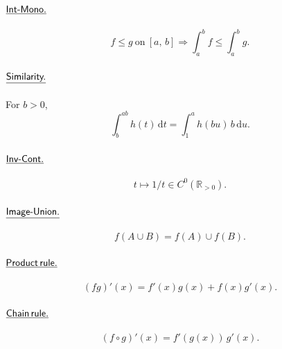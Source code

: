 \documentclass[11pt,reqno]{amsart}
\providecommand{\R}{\mathbb{R}}
\newcommand{\comma}{,\,\allowbreak}
\theoremstyle{redplain}
\begin{document}
\paragraph{$\textsf{\underline{Int-Mono.}}$}\text{\ }
\begin{equation}\label{eq:int-mono}
f\le g\ \text{on}\ [a\comma b]\Rightarrow\int_a^b f\le\int_a^b g.
\end{equation}

\paragraph{$\textsf{\underline{Similarity.}}$}\text{\ } For $b>0$\comma
\begin{equation}\label{eq:similarity}
\int_b^{ab} h(t)\,\mathrm{d}t=\int_1^a h(bu)\,b\,\mathrm{d}u.
\end{equation}

\paragraph{$\textsf{\underline{Inv-Cont.}}$}\text{\ }
\begin{equation}\label{eq:inv-cont}
t\mapsto1/t\in C^0(\R_{>0}).
\end{equation}

\paragraph{$\textsf{\underline{Image-Union.}}$}\text{\ }
\begin{equation}\label{eq:image-union}
f(A\cup B)=f(A)\cup f(B).
\end{equation}

\paragraph{$\textsf{\underline{Product\,rule.}}$}\text{\ }
\begin{equation}\label{eq:product-rule}
(fg)'(x)=f'(x)g(x)+f(x)g'(x).
\end{equation}

\paragraph{$\textsf{\underline{Chain\,rule.}}$}\text{\ }
\begin{equation}\label{eq:chain-rule}
(f\circ g)'(x)=f'(g(x))\,g'(x).
\end{equation}
\end{document}
